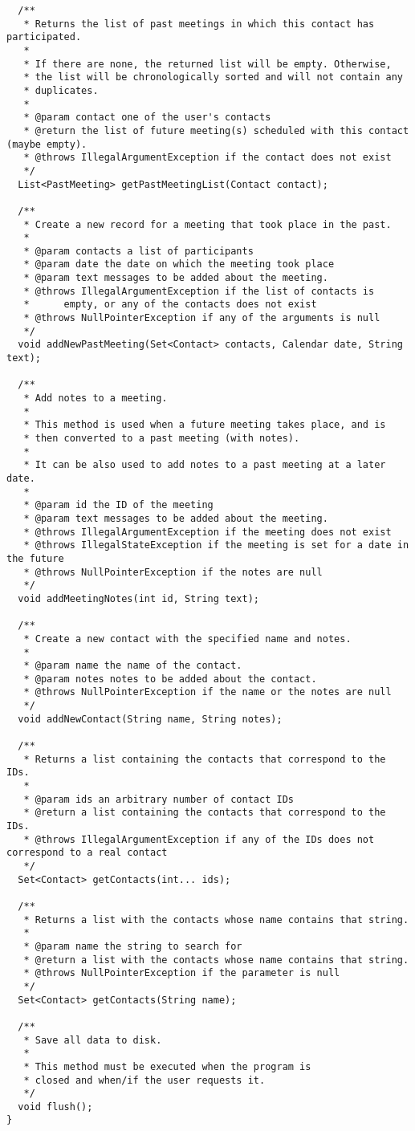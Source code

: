 \documentclass{article}
\begin{document}
\begin{verbatim}
  /**
   * Returns the list of past meetings in which this contact has participated.
   * 
   * If there are none, the returned list will be empty. Otherwise,
   * the list will be chronologically sorted and will not contain any
   * duplicates. 
   * 
   * @param contact one of the user's contacts
   * @return the list of future meeting(s) scheduled with this contact (maybe empty).
   * @throws IllegalArgumentException if the contact does not exist
   */
  List<PastMeeting> getPastMeetingList(Contact contact);

  /**
   * Create a new record for a meeting that took place in the past.
   *
   * @param contacts a list of participants
   * @param date the date on which the meeting took place
   * @param text messages to be added about the meeting. 
   * @throws IllegalArgumentException if the list of contacts is
   *      empty, or any of the contacts does not exist
   * @throws NullPointerException if any of the arguments is null
   */
  void addNewPastMeeting(Set<Contact> contacts, Calendar date, String text);

  /**
   * Add notes to a meeting. 
   * 
   * This method is used when a future meeting takes place, and is
   * then converted to a past meeting (with notes). 
   * 
   * It can be also used to add notes to a past meeting at a later date.
   * 
   * @param id the ID of the meeting
   * @param text messages to be added about the meeting.  
   * @throws IllegalArgumentException if the meeting does not exist
   * @throws IllegalStateException if the meeting is set for a date in the future
   * @throws NullPointerException if the notes are null
   */
  void addMeetingNotes(int id, String text);

  /**
   * Create a new contact with the specified name and notes.
   * 
   * @param name the name of the contact.
   * @param notes notes to be added about the contact.   
   * @throws NullPointerException if the name or the notes are null
   */
  void addNewContact(String name, String notes);

  /**
   * Returns a list containing the contacts that correspond to the IDs.
   *
   * @param ids an arbitrary number of contact IDs
   * @return a list containing the contacts that correspond to the IDs.
   * @throws IllegalArgumentException if any of the IDs does not correspond to a real contact
   */
  Set<Contact> getContacts(int... ids);

  /**
   * Returns a list with the contacts whose name contains that string. 
   * 
   * @param name the string to search for
   * @return a list with the contacts whose name contains that string. 
   * @throws NullPointerException if the parameter is null
   */
  Set<Contact> getContacts(String name);

  /**
   * Save all data to disk. 
   * 
   * This method must be executed when the program is 
   * closed and when/if the user requests it. 
   */
  void flush();
}
\end{verbatim}
\end{document}
